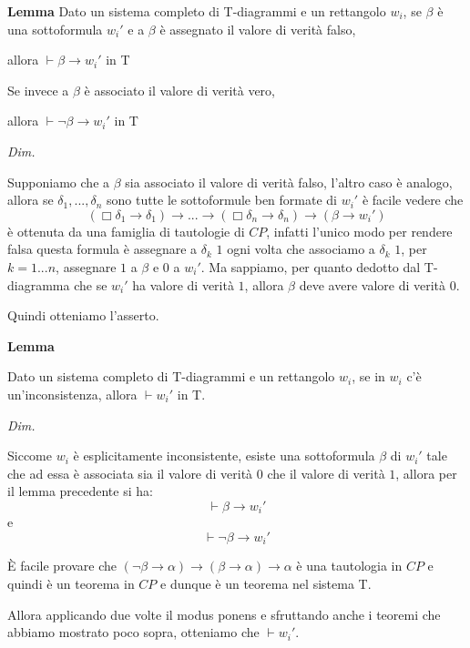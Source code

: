 \documentclass[a4paper, 12pt]{article}
\begin{document}
\begin{flushleft}
\textbf{Lemma}
Dato un sistema completo di T-diagrammi e un rettangolo $w_i$,
se $\beta$ è una sottoformula $w_i'$ e a $\beta$ è assegnato il valore di verità falso,

allora $\vdash \beta \rightarrow w_i'$ in T

Se invece a $\beta$ è associato il valore di verità vero,


allora $\vdash \neg \beta \rightarrow w_i'$ in T

\textit{Dim.}

Supponiamo che a $\beta$ sia associato il valore di verità falso, l'altro caso è analogo,
allora se $\delta_1, ..., \delta_n$ sono tutte le sottoformule ben formate di $w_i'$ è
facile vedere che
$$(\Box \delta_1 \rightarrow \delta_1) \rightarrow ... \rightarrow (\Box \delta_n \rightarrow \delta_n) \rightarrow (\beta \rightarrow w_i')$$
è ottenuta da una famiglia di tautologie di $CP$, infatti l'unico modo per rendere
falsa questa formula è assegnare a $\delta_k$ $1$ ogni volta che associamo a $\delta_k$ $1$,
per $k = 1 ... n$, assegnare $1$ a $\beta$ e $0$ a $w_i'$.
Ma sappiamo, per quanto dedotto dal T-diagramma che se $w_i'$ ha valore di verità $1$,
allora $\beta$ deve avere valore di verità $0$.

Quindi otteniamo l'asserto.

\end{flushleft}


\begin{flushleft}
\textbf{Lemma}

Dato un sistema completo di T-diagrammi e un rettangolo $w_i$,
se in $w_i$ c'è un'inconsistenza, allora $\vdash w_i'$ in T.

\textit{Dim.}

Siccome $w_i$ è esplicitamente inconsistente, esiste una sottoformula $\beta$ di $w_i'$
tale che ad essa è associata sia il valore di verità $0$ che il valore di verità $1$,
allora per il lemma precedente si ha:
$$\vdash \beta \rightarrow w_i'$$
e
$$\vdash \neg \beta \rightarrow w_i'$$

È facile provare che
$(\neg \beta \rightarrow \alpha) \rightarrow (\beta \rightarrow \alpha) \rightarrow \alpha$
è una tautologia in $CP$ e quindi è un teorema in $CP$ e dunque è un teorema nel sistema T.

Allora applicando due volte il modus ponens e sfruttando anche i teoremi che abbiamo mostrato poco sopra,
otteniamo che $\vdash w_i'$.

\end{flushleft}
\end{document}
